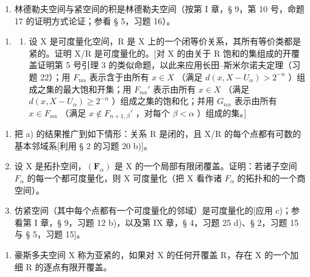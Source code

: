 \begin{enumerate}
\def\labelenumi{\alph{enumi})}
\setcounter{enumi}{1}
\tightlist
\item
  林德勒夫空间与紧空间的积是林德勒夫空间（按第 I 章，§ 9，第 10 号，命题 17 的证明方式论证；参看 § 5，习题 16）。
\end{enumerate}

\begin{enumerate}
\def\labelenumi{\arabic{enumi})}
\setcounter{enumi}{23}
\tightlist
\item
  \begin{enumerate}
  \def\labelenumii{\alph{enumii})}
  \tightlist
  \item
    设 X 是可度量化空间，R 是 X 上的一个闭等价关系，其所有等价类都是紧的。证明 X/R 是可度量化的。{[}对 X 的由关于 R 饱和的集组成的开覆盖证明第 5 号引理 3 的类似命题，以此来应用长田–斯米尔诺夫定理（习题 22）；用 \(F_{n\alpha}\) 表示含于由所有 \(x \in X\) （满足 \(d(x, X - U_{\alpha}) > 2^{-n}\) ）组成之集的最大饱和开集；用 \(F_{n\alpha}'\) 表示由所有 \(x \in X\) （满足 \(d(x, X - U_{\alpha}) \geqslant 2^{-n}\) ）组成之集的饱和化；并用 \(G_{n\alpha}\) 表示由所有 \(x \in F_{n\alpha}\) （满足 \(x \notin F_{n+1,\beta}'\) ，对每个 \(\beta < \alpha\) ）组成的集。{]}
  \end{enumerate}
\end{enumerate}

\begin{enumerate}
\def\labelenumi{\alph{enumi})}
\setcounter{enumi}{1}
\item
  把 a) 的结果推广到如下情形：关系 R 是闭的，且 X/R 的每个点都有可数的基本邻域系{[}利用 § 2 的习题 20 b){]}。
\item
  设 X 是拓扑空间，\((\mathbf{F}_{\alpha})\) 是 X 的一个局部有限闭覆盖。证明：若诸子空间 \(F_{\alpha}\) 的每一个都可度量化，则 X 可度量化（把 X 看作诸 \(F_{\alpha}\) 的拓扑和的一个商空间）。
\item
  仿紧空间（其中每个点都有一个可度量化的邻域）是可度量化的{[}应用 c)；参看第 I 章，§ 9，习题 12 b)，以及第 IX 章，§ 4，习题 25 d)、§ 2，习题 15 与 § 5，习题 15{]}。
\end{enumerate}

\begin{enumerate}
\def\labelenumi{\arabic{enumi})}
\setcounter{enumi}{24}
\tightlist
\item
  豪斯多夫空间 X 称为亚紧的，如果对 X 的任何开覆盖 R，存在 X 的一个加细 R 的逐点有限开覆盖。
\end{enumerate}

